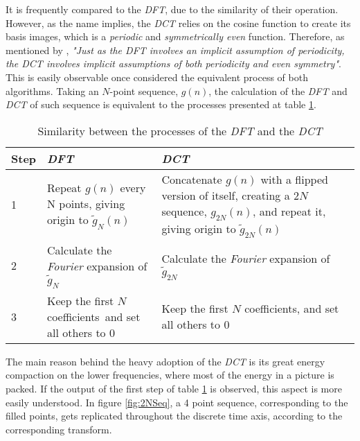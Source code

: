 It is frequently compared to the \emph{DFT}, due to the similarity of their operation. However, as the name implies, the \emph{DCT} relies on the cosine function to create its basis images, which is a \emph{periodic} and \emph{symmetrically even} function. Therefore, as mentioned by \cite[A. V. Oppenheim]{oppenheimDiscretetimeSignalProcessing1998}, \emph{"Just as the DFT involves an implicit assumption of periodicity, the DCT involves implicit assumptions of both periodicity and even symmetry"}.  This is easily observable once considered the equivalent process of both algorithms. Taking an $N$-point sequence, $g(n)$, the calculation of the \emph{DFT} and \emph{DCT} of such sequence is equivalent to the processes presented at table \ref{tab:DFTDCT}.

\begin{table}[h]
    \centering
    \begin{tabular}{@{}lllll@{}} \toprule
        \textbf{Step} &      \multicolumn{2}{l}{\textbf{\emph{DFT}}} &      \multicolumn{2}{l}{\textbf{\emph{DCT}}} \\ \hline
        1 &         \multicolumn{2}{p{0.4\textwidth}}{Repeat $g(n)$ every N points, giving origin to $\widetilde{g}_N(n)$} &         \multicolumn{2}{p{0.4\textwidth}}{Concatenate $g(n)$ with a flipped version of itself, creating a $2N$ sequence, $g_{2N}(n)$, and repeat it, giving origin to $\widetilde{g}_{2N}(n)$}\\ \hline
        2 &         \multicolumn{2}{p{0.4\textwidth}}{Calculate the \emph{Fourier} expansion of $\widetilde{g}_N$} &         \multicolumn{2}{p{0.4\textwidth}}{Calculate the \emph{Fourier} expansion of $\widetilde{g}_{2N}$}\\ \hline
        3 &         \multicolumn{2}{p{0.4\textwidth}}{Keep the first $N$ coefficients\, and set all others to $0$} &         \multicolumn{2}{p{0.4\textwidth}}{Keep the first $N$ coefficients, and set all others to $0$}\\ 
        \bottomrule
    \end{tabular}
    \caption{Similarity between the processes of the        \emph{DFT} and the \emph{DCT}}
    \label{tab:DFTDCT}
\end{table}

The main reason behind the heavy adoption of the \emph{DCT} is its great energy compaction on the lower frequencies, where most of the energy in a picture is packed. If the output of the first step of table \ref{tab:DFTDCT} is observed, this aspect is more easily understood. In figure \ref{fig:2NSeq}, a 4 point sequence, corresponding to the filled points, gets replicated throughout the discrete time axis, according to the corresponding transform.

